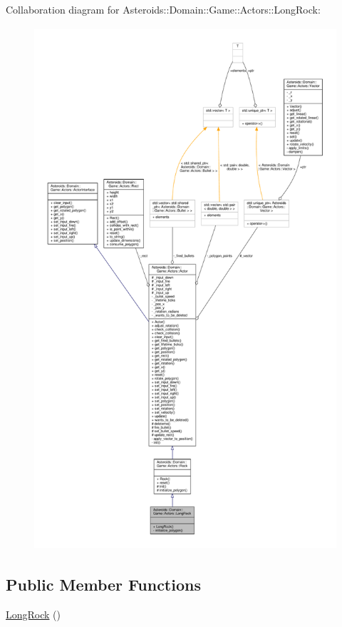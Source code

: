Collaboration diagram for Asteroids\+:\+:Domain\+:\+:Game\+:\+:Actors\+:\+:Long\+Rock\+:\nopagebreak
\begin{figure}[H]
\begin{center}
\leavevmode
\includegraphics[height=550pt]{classAsteroids_1_1Domain_1_1Game_1_1Actors_1_1LongRock__coll__graph}
\end{center}
\end{figure}
\subsection*{Public Member Functions}
\begin{DoxyCompactItemize}
\item 
\hyperlink{classAsteroids_1_1Domain_1_1Game_1_1Actors_1_1LongRock_a076888291134eee7db8c6a94ebc0ad8d}{Long\+Rock} ()
\end{DoxyCompactItemize}
